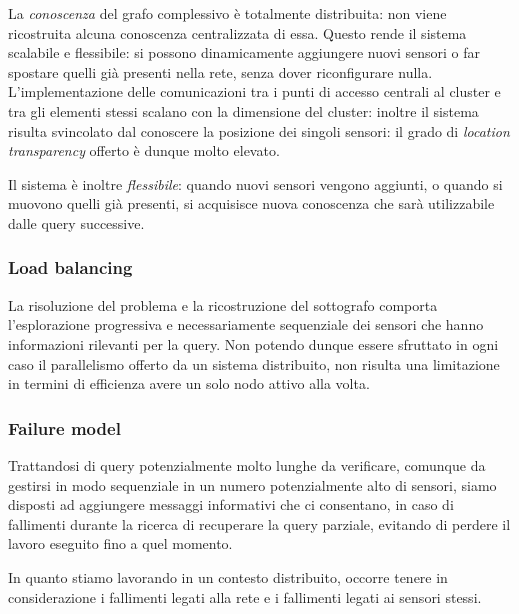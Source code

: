 \documentclass{llncs}
\begin{document}
La \emph{conoscenza} del grafo complessivo è totalmente distribuita:
non viene ricostruita alcuna conoscenza centralizzata di essa.
Questo rende il sistema scalabile e flessibile:
si possono dinamicamente aggiungere nuovi sensori o far spostare
quelli già presenti nella rete, senza dover riconfigurare nulla.
L'implementazione delle
comunicazioni tra i punti di accesso centrali al cluster e
tra gli elementi stessi scalano con la dimensione del cluster:
inoltre il sistema risulta svincolato dal conoscere la posizione
dei singoli sensori: il grado di \emph{location transparency} offerto
è dunque molto elevato.

Il sistema è inoltre \emph{flessibile}: quando nuovi sensori vengono
aggiunti, o quando si muovono quelli già presenti, si acquisisce
nuova conoscenza che sarà utilizzabile dalle query successive.

\subsubsection*{Load balancing}
La risoluzione del problema e la ricostruzione del sottografo
comporta l'esplorazione progressiva e necessariamente sequenziale
dei sensori che hanno informazioni rilevanti per la query.
Non potendo dunque essere sfruttato in ogni caso il parallelismo
offerto da un sistema distribuito, non risulta una limitazione
in termini di efficienza avere un solo nodo attivo alla volta.

\subsubsection*{Failure model}
Trattandosi di query potenzialmente molto lunghe da verificare,
comunque da gestirsi in modo sequenziale in un numero potenzialmente
alto di sensori,
siamo disposti ad aggiungere messaggi informativi che ci consentano,
in caso di fallimenti durante la ricerca di recuperare la query parziale,
evitando di perdere il lavoro eseguito fino a quel momento.

In quanto stiamo lavorando in un contesto distribuito,
occorre tenere in considerazione i fallimenti legati alla rete e i
fallimenti legati ai sensori stessi.
\end{document}

